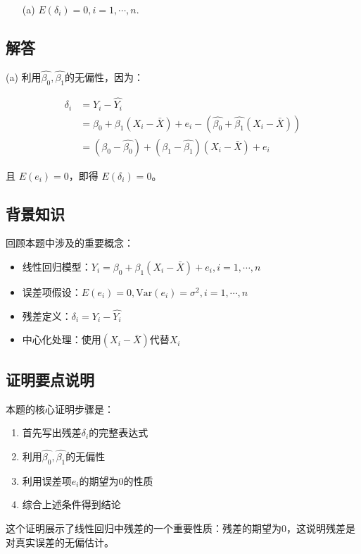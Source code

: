 \documentclass[UTF8]{report}
\theoremstyle{MyLineTheoremStyle} %
\theoremstyle{MyBlockTheoremStyle} %
\theoremstyle{MySubsubsectionStyle} %
\begin{document}
\begin{enumerate}
    \item[(a)] $E(\delta_i) = 0, i = 1, \cdots, n$.
\end{enumerate}

\subsection{解答}
(a) 利用$\hat{\beta_0}, \hat{\beta_1}$的无偏性，因为：

\begin{align*}
\delta_i &= Y_i - \hat{Y_i} \\
&= \beta_0 + \beta_1(X_i - \bar{X}) + e_i - (\hat{\beta_0} + \hat{\beta_1}(X_i - \bar{X})) \\
&= (\beta_0 - \hat{\beta_0}) + (\beta_1 - \hat{\beta_1})(X_i - \bar{X}) + e_i
\end{align*}

且 $E(e_i) = 0$，即得 $E(\delta_i) = 0$。

\subsection{背景知识}
回顾本题中涉及的重要概念：

\begin{itemize}
    \item 线性回归模型：$Y_i = \beta_0 + \beta_1(X_i - \bar{X}) + e_i, i = 1, \cdots, n$
    \item 误差项假设：$E(e_i) = 0, \text{Var}(e_i) = \sigma^2, i = 1, \cdots, n$
    \item 残差定义：$\delta_i = Y_i - \hat{Y_i}$
    \item 中心化处理：使用$(X_i - \bar{X})$代替$X_i$
\end{itemize}

\subsection{证明要点说明}
本题的核心证明步骤是：
\begin{enumerate}
    \item 首先写出残差$\delta_i$的完整表达式
    \item 利用$\hat{\beta_0}, \hat{\beta_1}$的无偏性
    \item 利用误差项$e_i$的期望为0的性质
    \item 综合上述条件得到结论
\end{enumerate}

这个证明展示了线性回归中残差的一个重要性质：残差的期望为0，这说明残差是对真实误差的无偏估计。
\end{document}
